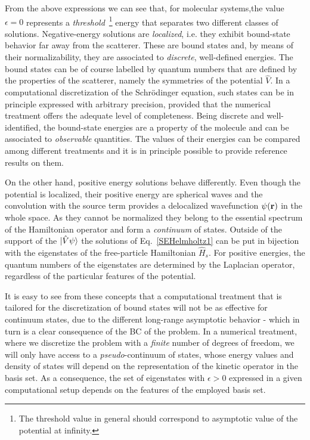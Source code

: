 \documentclass[reprint,aps,prb]{revtex4-1}
\renewcommand{\r}{{\bf r}}
\newcommand{\op}[1]{\hat {#1}}
\begin{document}
From the above expressions we can see that, for molecular systems,the value $\epsilon=0$
represents a \emph{threshold}~\footnote{The threshold value in general should correspond to asymptotic value of the potential at infinity.}
energy that separates two different classes of solutions.
Negative-energy solutions are \emph{localized}, i.e. they exhibit bound-state behavior far away from the scatterer.
These are bound states and, by means of their normalizability, they are associated to \emph{discrete}, well-defined energies.
The bound states can be of course labelled by quantum numbers that are defined by the properties of the scatterer, namely the
symmetries of the potential $\op V$.
In a computational discretization of the Schr\"odinger equation, such states can be in principle expressed with arbitrary precision,
provided that the numerical treatment offers the adequate level of completeness.
Being discrete and well-identified, the bound-state energies are a property of the molecule and can be associated to \emph{observable}
quantities. The values of their energies can be compared among different treatments and it is in principle possible to
provide reference results on them.


On the other hand, positive energy solutions behave differently.
Even though the potential is localized, their positive energy are
 spherical waves and the convolution with the source term provides a delocalized wavefunction $\psi(\r)$ in the whole space.
As they cannot be normalized they belong to the essential spectrum of the Hamiltonian operator and form a \emph{continuum} of states.
Outside of the support of the $\ket{\op V \psi}$ the solutions of Eq.~\eqref{SEHelmholtz1} can be put in bijection with the eigenstates of the
free-particle Hamiltonian $\op H_s$. For positive energies, the quantum numbers of the eigenstates are determined by the Laplacian operator,
regardless of the particular features of the potential.

It is easy to see from these concepts that a computational treatment that is tailored for the discretization of bound states
will not be as effective for continuum states, due to the different long-range asymptotic behavior - which in turn is a clear consequence of the
BC of the problem. In a numerical treatment, where we discretize the problem with a \emph{finite}
number of degrees of freedom, we will only have access to a \emph{pseudo}-continuum of states,
whose energy values and density of states will depend on the representation of the kinetic operator
in the basis set. As a consequence, the set of eigenstates with $\epsilon > 0$ expressed in a given computational setup depends on the features of the employed basis set.
\end{document}
